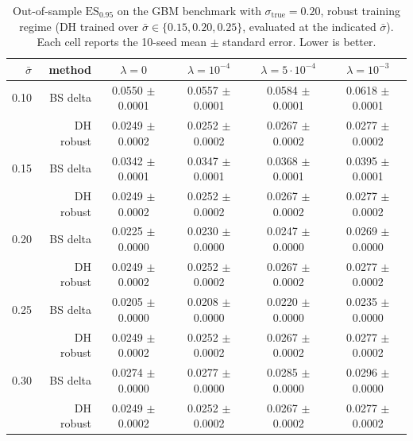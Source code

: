 \documentclass[12pt,a4paper]{article}
\theoremstyle{definition}
\theoremstyle{plain}
\theoremstyle{remark}
\theoremstyle{plain}
\begin{document}
\begin{table}[H]
\centering
\caption{Out-of-sample $\mathrm{ES}_{0.95}$ on the GBM benchmark with
$\sigma_{\mathrm{true}} = 0.20$, robust training regime (DH trained
over $\bar\sigma \in \{0.15, 0.20, 0.25\}$, evaluated at the indicated
$\bar\sigma$). Each cell reports the 10-seed mean $\pm$ standard error.
Lower is better.}
\label{tab:gbm_table2_robust}
\begin{tabular}{r r c c c c}
\toprule
$\bar\sigma$ & method & $\lambda = 0$ & $\lambda = 10^{-4}$ & $\lambda = 5{\cdot}10^{-4}$ & $\lambda = 10^{-3}$ \\
\midrule
0.10 & BS delta  & 0.0550 $\pm$ 0.0001 & 0.0557 $\pm$ 0.0001 & 0.0584 $\pm$ 0.0001 & 0.0618 $\pm$ 0.0001 \\
     & DH robust & 0.0249 $\pm$ 0.0002 & 0.0252 $\pm$ 0.0002 & 0.0267 $\pm$ 0.0002 & 0.0277 $\pm$ 0.0002 \\
\midrule
0.15 & BS delta  & 0.0342 $\pm$ 0.0001 & 0.0347 $\pm$ 0.0001 & 0.0368 $\pm$ 0.0001 & 0.0395 $\pm$ 0.0001 \\
     & DH robust & 0.0249 $\pm$ 0.0002 & 0.0252 $\pm$ 0.0002 & 0.0267 $\pm$ 0.0002 & 0.0277 $\pm$ 0.0002 \\
\midrule
0.20 & BS delta  & 0.0225 $\pm$ 0.0000 & 0.0230 $\pm$ 0.0000 & 0.0247 $\pm$ 0.0000 & 0.0269 $\pm$ 0.0000 \\
     & DH robust & 0.0249 $\pm$ 0.0002 & 0.0252 $\pm$ 0.0002 & 0.0267 $\pm$ 0.0002 & 0.0277 $\pm$ 0.0002 \\
\midrule
0.25 & BS delta  & 0.0205 $\pm$ 0.0000 & 0.0208 $\pm$ 0.0000 & 0.0220 $\pm$ 0.0000 & 0.0235 $\pm$ 0.0000 \\
     & DH robust & 0.0249 $\pm$ 0.0002 & 0.0252 $\pm$ 0.0002 & 0.0267 $\pm$ 0.0002 & 0.0277 $\pm$ 0.0002 \\
\midrule
0.30 & BS delta  & 0.0274 $\pm$ 0.0000 & 0.0277 $\pm$ 0.0000 & 0.0285 $\pm$ 0.0000 & 0.0296 $\pm$ 0.0000 \\
     & DH robust & 0.0249 $\pm$ 0.0002 & 0.0252 $\pm$ 0.0002 & 0.0267 $\pm$ 0.0002 & 0.0277 $\pm$ 0.0002 \\
\bottomrule
\end{tabular}
\end{table}
\end{document}
